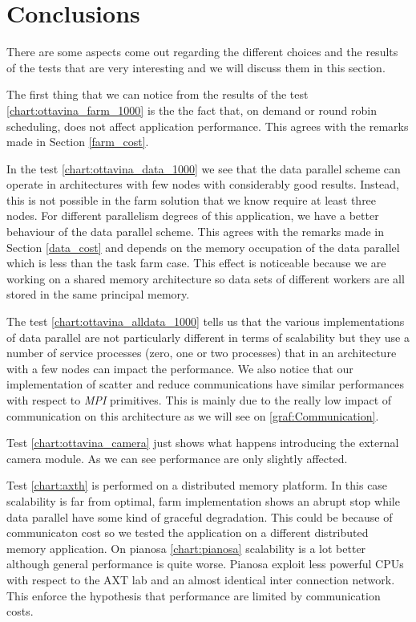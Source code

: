 \section{Conclusions}

There are some aspects come out regarding the different choices and the results of the tests that are very interesting and we will discuss them in this section.

The first thing that we can notice from the results of the test \ref{chart:ottavina_farm_1000} is the the fact that, on demand or round robin scheduling, does not affect application performance.
This agrees with the remarks made in Section \ref{farm_cost}.

In the test \ref{chart:ottavina_data_1000} we see that the data parallel scheme can operate in architectures with few nodes with considerably good results.
Instead, this is not possible in the farm solution that we know require at least three nodes. 
For different parallelism degrees of this application, we have a better behaviour of the data parallel scheme. 
This agrees with the remarks made in Section \ref{data_cost} and depends on the memory occupation of the data parallel which is less than the task farm case. 
This effect is noticeable because we are working on a shared memory architecture so data sets of different workers are all stored in the same principal memory.

The test \ref{chart:ottavina_alldata_1000} tells us that the various implementations of data parallel are not particularly different in terms of scalability but they use a number of service processes (zero, one or two processes) that in an architecture with a few nodes can impact the performance.
We also notice that our implementation of scatter and reduce communications have similar performances with respect to \textit{MPI} primitives.
This is mainly due to the really low impact of communication on this architecture as we will see on \ref{graf:Communication}.

Test \ref{chart:ottavina_camera} just shows what happens introducing the external camera module. 
As we can see performance are only slightly affected.

Test \ref{chart:axth} is performed on a distributed memory platform. 
In this case scalability is far from optimal, farm implementation shows an abrupt stop while data parallel have some kind of graceful degradation.
This could be because of communicaton cost so we tested the application on a different distributed memory application.
On pianosa \ref{chart:pianosa} scalability is a lot better although general performance is quite worse.
Pianosa exploit less powerful CPUs with respect to the AXT lab and an almost identical inter connection network.
This enforce the hypothesis that performance are limited by communication costs.

